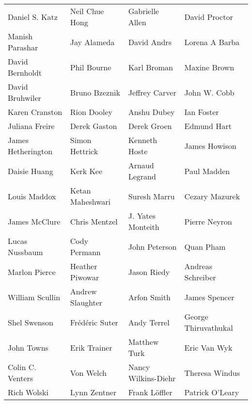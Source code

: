\documentclass[11pt, oneside]{amsart}
\begin{document}
\begin{tabular}{ L{4cm}  L{4cm}  L{4cm}  L{4cm} }
   Daniel S. Katz
&  Neil Chue Hong
&  Gabrielle Allen
&  David Proctor
\\ Manish Parashar
&  Jay Alameda
&  David Andrs
&  Lorena A Barba
\\ David Bernholdt
&  Phil Bourne
&  Karl Broman
&  Maxine Brown
\\ David Bruhwiler
&  Bruno Bzeznik
&  Jeffrey Carver
&  John W. Cobb
\\ Karen Cranston
&  Rion Dooley
&  Anshu Dubey
&  Ian Foster
\\Juliana Freire
& Derek Gaston
& Derek Groen
& Edmund Hart
\\James Hetherington
& Simon Hettrick
& Kenneth Hoste
& James Howison
\\Daisie Huang
& Kerk Kee
& Arnaud Legrand
& Paul Madden
\\Louis Maddox
& Ketan Maheshwari
& Suresh Marru
& Cezary Mazurek
\\James McClure
& Chris Mentzel
& J. Yates Monteith
& Pierre Neyron
\\Lucas Nussbaum
& Cody Permann
& John Peterson
& Quan Pham
\\Marlon Pierce
& Heather Piwowar
& Jason Riedy
& Andreas Schreiber
\\William Scullin
& Andrew Slaughter
& Arfon Smith
& James Spencer
\\Shel Swenson
& Fr\'{e}d\'{e}ric Suter
& Andy Terrel
& George  Thiruvathukal
\\John Towns
& Erik Trainer
& Matthew Turk
& Eric Van Wyk
\\Colin C. Venters
& Von Welch
& Nancy Wilkins-Diehr
& Theresa Windus
\\Rich Wolski
& Lynn Zentner
& Frank L\"{o}ffler
& Patrick O'Leary
\end{tabular}






\end{document}
